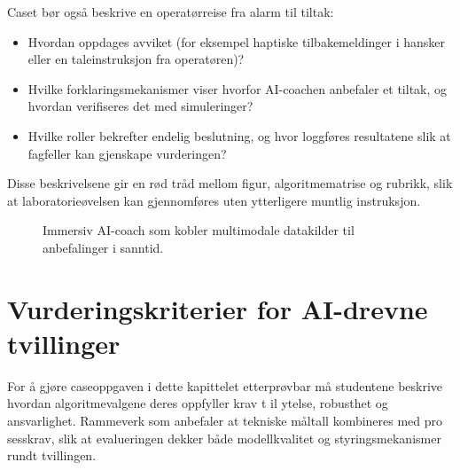 Caset bør også beskrive en operatørreise fra alarm til tiltak:
\begin{itemize}
    \item Hvordan oppdages avviket (for eksempel haptiske tilbakemeldinger i hansker eller en taleinstruksjon fra operatøren)?
    \item Hvilke forklaringsmekanismer viser hvorfor AI-coachen anbefaler et tiltak, og hvordan verifiseres det med simuleringer?
    \item Hvilke roller bekrefter endelig beslutning, og hvor loggføres resultatene slik at fagfeller kan gjenskape vurderingen?
\end{itemize}

Disse beskrivelsene gir en rød tråd mellom figur, algoritmematrise og rubrikk, slik at laboratorieøvelsen kan gjennomføres uten ytterligere muntlig instruksjon.

\begin{figure}[htbp]
    \centering
    \caption{Immersiv AI-coach som kobler multimodale datakilder til anbefalinger i sanntid.}
    \label{fig:kap05-operator-coach}
\end{figure}

\section{Vurderingskriterier for AI-drevne tvillinger}
For å gjøre caseoppgaven i dette kapittelet etterprøvbar må studentene beskrive hvordan algoritmevalgene deres oppfyller krav t
il ytelse, robusthet og ansvarlighet. Rammeverk som \citet{ec2020trustworthyai} anbefaler at tekniske måltall kombineres med pro
sesskrav, slik at evalueringen dekker både modellkvalitet og styringsmekanismer rundt tvillingen.

